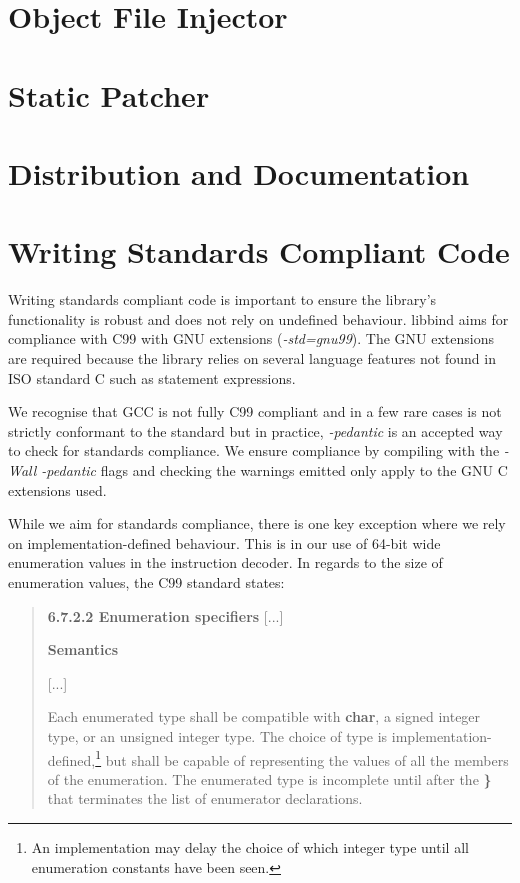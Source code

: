 \section{Object File Injector}
\section{Static Patcher}

\section{Distribution and Documentation}

%
%

\section{Writing Standards Compliant Code}\label{sec:standards_compliance}

Writing standards compliant code is important to ensure the library's functionality is robust and does not rely on undefined behaviour. libbind aims for compliance with C99 with GNU extensions (\emph{-std=gnu99}). The GNU extensions are required because the library relies on several language features not found in ISO standard C such as statement expressions. 

We recognise that GCC is not fully C99 compliant and in a few rare cases is not strictly conformant to the standard but in practice, \emph{-pedantic} is an accepted way to check for standards compliance. We ensure compliance by compiling with the \emph{-Wall -pedantic} flags and checking the warnings emitted only apply to the GNU C extensions used.

While we aim for standards compliance, there is one key exception where we rely on implementation-defined behaviour. This is in our use of 64-bit wide enumeration values in the instruction decoder. In regards to the size of enumeration values, the C99 standard states:

\begin{quote}
\begin{minipage}{\linewidth}
\textbf{6.7.2.2 Enumeration specifiers}
[...]

\textbf{Semantics}

[...]

Each enumerated type shall be compatible with \textbf{char}, a signed integer type, or an unsigned integer type. The choice of type is implementation-defined,\footnote{An implementation may delay the choice of which integer type until all enumeration constants have been seen.} but shall be capable of representing the values of all the members of the enumeration. The enumerated type is incomplete until after the \textbf{\}} that terminates the list of enumerator declarations.
\end{minipage}
\end{quote}


